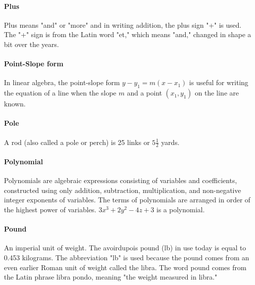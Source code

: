 \documentclass[12pt]{article}
\begin{document}
{\begin{center}
\end{center}

\paragraph{Plus}
Plus means "and" or "more" and in writing addition, the plus sign "+" is used. The "+" sign is from the Latin word "et," which means "and," changed in shape a bit over the years.

\paragraph{Point-Slope form}
In linear algebra, the point-slope form \(y - y_1 = m(x - x_1)\) is useful for writing the equation of a line when the slope \(m\) and a point \((x_1, y_1)\) on the line are known.

\paragraph{Pole}
A rod (also called a pole or perch) is 25 links or $5\frac{1}{2}$ yards.

\paragraph{Polynomial}
Polynomials are algebraic expressions consisting of variables and coefficients, constructed using only addition, subtraction, multiplication, and non-negative integer exponents of variables. The terms of polynomials are arranged in order of the highest power of variables. $3x^3+2y^2-4z+3$ is a polynomial.

\paragraph{Pound}
An imperial unit of weight. The avoirdupois pound (lb) in use today is equal to 0.453 kilograms. The abbreviation "lb" is used because the pound comes from an even earlier Roman unit of weight called the libra. The word pound comes from the Latin phrase libra pondo, meaning "the weight measured in libra."

}
\end{document}

